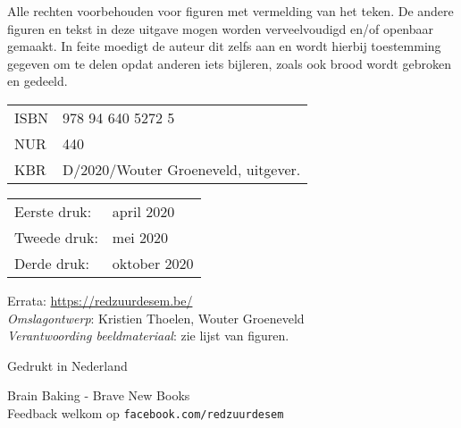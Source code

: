 Alle rechten voorbehouden voor figuren met vermelding van het \textcopyright \: teken. De andere figuren en tekst in deze uitgave mogen worden verveelvoudigd en/of openbaar gemaakt. In feite moedigt de auteur dit zelfs aan en wordt hierbij toestemming gegeven om te delen opdat anderen iets bijleren, zoals ook brood wordt gebroken en gedeeld. 

\begin{center}
\begin{tabular}{ll}
 ISBN & 978 94 640 5272 5 \\
 NUR  &  440 \\
 KBR  & D/2020/Wouter Groeneveld, uitgever.
\end{tabular}
\end{center}

\begin{center}
\begin{tabular}{ll}
Eerste druk:  & april 2020 \\
Tweede druk:  & mei 2020 \\
Derde druk:   & oktober 2020
\end{tabular}
\end{center}

\vfill

Errata: \url{https://redzuurdesem.be/} \\

\hspace*{2em} \textit{Omslagontwerp}: Kristien Thoelen, Wouter Groeneveld \\
\hspace*{2em} \textit{Verantwoording beeldmateriaal}: zie lijst van figuren. \\

\vfill

Gedrukt in Nederland

Brain Baking - Brave New Books \\
Feedback welkom op \texttt{facebook.com/redzuurdesem}

\vspace*{2\baselineskip}
\clearpage


 \newenvironment{dedication}
     {\vspace{6ex}\begin{quotation}\begin{center}\begin{em}}
     {\par\end{em}\end{center}\end{quotation}}

